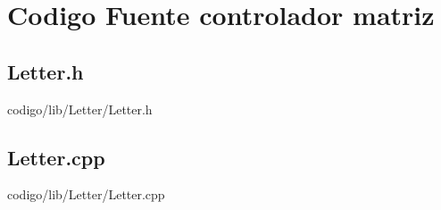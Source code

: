 \section{Codigo Fuente controlador matriz}
\subsection{Letter.h}


                     {codigo/lib/Letter/Letter.h}
                     
\newpage
                     
\subsection{Letter.cpp}


                     {codigo/lib/Letter/Letter.cpp}
                     